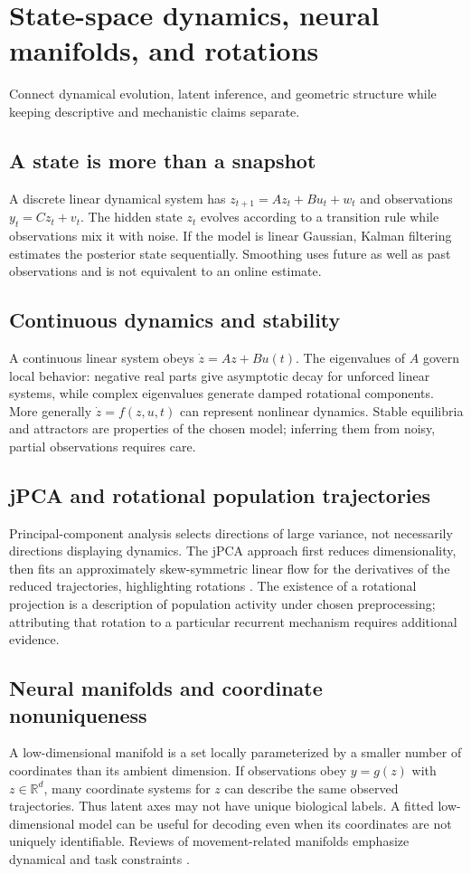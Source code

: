 \chapter{State-space dynamics, neural manifolds, and rotations}\label{ch:dynamics}
\begin{readergoal}Connect dynamical evolution, latent inference, and geometric structure while keeping descriptive and mechanistic claims separate.\end{readergoal}
\section{A state is more than a snapshot}
A discrete linear dynamical system has $z_{t+1}=Az_t+Bu_t+w_t$ and observations $y_t=Cz_t+v_t$. The hidden state $z_t$ evolves according to a transition rule while observations mix it with noise. If the model is linear Gaussian, Kalman filtering estimates the posterior state sequentially. Smoothing uses future as well as past observations and is not equivalent to an online estimate.

\section{Continuous dynamics and stability}
A continuous linear system obeys $\dot z=Az+Bu(t)$. The eigenvalues of $A$ govern local behavior: negative real parts give asymptotic decay for unforced linear systems, while complex eigenvalues generate damped rotational components. More generally $\dot z=f(z,u,t)$ can represent nonlinear dynamics. Stable equilibria and attractors are properties of the chosen model; inferring them from noisy, partial observations requires care.

\section{jPCA and rotational population trajectories}
Principal-component analysis selects directions of large variance, not necessarily directions displaying dynamics. The jPCA approach first reduces dimensionality, then fits an approximately skew-symmetric linear flow for the derivatives of the reduced trajectories, highlighting rotations \cite{Churchland2012}. The existence of a rotational projection is a description of population activity under chosen preprocessing; attributing that rotation to a particular recurrent mechanism requires additional evidence.

\section{Neural manifolds and coordinate nonuniqueness}
A low-dimensional manifold is a set locally parameterized by a smaller number of coordinates than its ambient dimension. If observations obey $y=g(z)$ with $z\in\mathbb R^d$, many coordinate systems for $z$ can describe the same observed trajectories. Thus latent axes may not have unique biological labels. A fitted low-dimensional model can be useful for decoding even when its coordinates are not uniquely identifiable. Reviews of movement-related manifolds emphasize dynamical and task constraints \cite{Gallego2017}.

